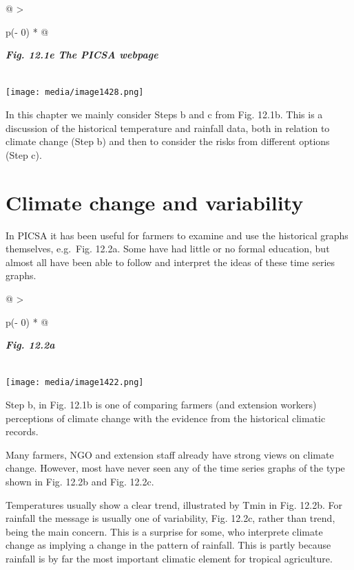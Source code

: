 \documentclass[
  letterpaper,
  DIV=11,
  numbers=noendperiod]{scrreprt}
\begin{document}
\begin{longtable}[]{@{}
  >{\raggedright\arraybackslash}p{(\columnwidth - 0\tabcolsep) * }@{}}
\toprule\noalign{}
\begin{minipage}[b]{\linewidth}\raggedright
\textbf{\emph{Fig. 12.1e The PICSA webpage}}
\end{minipage} \\
\midrule\noalign{}
\endhead
\bottomrule\noalign{}
\endlastfoot
\texttt{[image: media/image1428.png]} \\
\end{longtable}

In this chapter we mainly consider Steps b and c from Fig. 12.1b. This
is a discussion of the historical temperature and rainfall data, both in
relation to climate change (Step b) and then to consider the risks from
different options (Step c).

\section{Climate change and
variability}\label{climate-change-and-variability}

In PICSA it has been useful for farmers to examine and use the
historical graphs themselves, e.g.~Fig. 12.2a. Some have had little or
no formal education, but almost all have been able to follow and
interpret the ideas of these time series graphs.

\begin{longtable}[]{@{}
  >{\raggedright\arraybackslash}p{(\columnwidth - 0\tabcolsep) * }@{}}
\toprule\noalign{}
\begin{minipage}[b]{\linewidth}\raggedright
\textbf{\emph{Fig. 12.2a}}
\end{minipage} \\
\midrule\noalign{}
\endhead
\bottomrule\noalign{}
\endlastfoot
\texttt{[image: media/image1422.png]} \\
\end{longtable}

Step b, in Fig. 12.1b is one of comparing farmers (and extension
workers) perceptions of climate change with the evidence from the
historical climatic records.

Many farmers, NGO and extension staff already have strong views on
climate change. However, most have never seen any of the time series
graphs of the type shown in Fig. 12.2b and Fig. 12.2c.

Temperatures usually show a clear trend, illustrated by Tmin in Fig.
12.2b. For rainfall the message is usually one of variability, Fig.
12.2c, rather than trend, being the main concern. This is a surprise for
some, who interprete climate change as implying a change in the pattern
of rainfall. This is partly because rainfall is by far the most
important climatic element for tropical agriculture.
\end{document}
